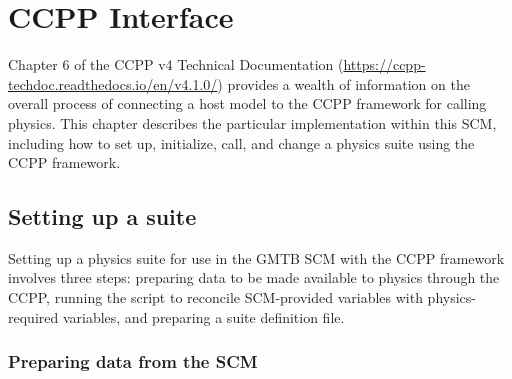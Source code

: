 \chapter{CCPP Interface}
\label{chapter: ccpp_interface}

Chapter 6 of the CCPP v4 Technical Documentation (\url{https://ccpp-techdoc.readthedocs.io/en/v4.1.0/}) provides a wealth of information on the overall process of connecting a host model to the CCPP framework for calling physics. This chapter describes the particular implementation within this SCM, including how to set up, initialize, call, and change a physics suite using the CCPP framework.

\section{Setting up a suite}

Setting up a physics suite for use in the GMTB SCM with the CCPP framework involves three steps: preparing data to be made available to physics through the CCPP, running the  script to reconcile SCM-provided variables with physics-required variables, and preparing a suite definition file.

\subsection{Preparing data from the SCM}

